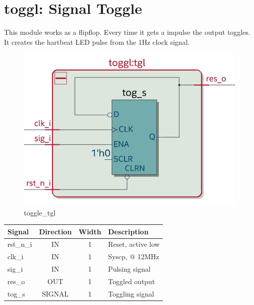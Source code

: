 \documentclass[12pt,a4 paper] {report}
\begin{document}
\newpage

\section{toggl: Signal Toggle}
This module works as a flipflop. Every time it gets a impulse the output toggles. It creates the hartbeat LED pulse 
from the 1Hz clock signal.
\begin{figure}[h]
	\centering	
	\includegraphics[scale=0.15]{../png/toggl_tgl.png}
	\caption{toggle\_tgl}
\end{figure}
\begin{center}
	\begin{tabular}{ | p{2cm} | c | c | p{5cm} |}
		\hline
		\textbf{Signal} & \textbf{Direction} & \textbf{Width} & \textbf{Description} \\
		\hline
		\hline
		rst\_n\_i & IN & 1 & Reset, active low \\
		\hline
		clk\_i & IN & 1 & Syscp, @ 12MHz \\
		\hline
		sig\_i & IN & 1 & Pulsing signal \\
		\hline
		res\_o & OUT & 1 & Toggled output \\
		\hline
		\hline	
		tog\_s & SIGNAL & 1 & Toggling signal \\
		\hline
	\end{tabular}
\end{center}

\newpage
\end{document}
